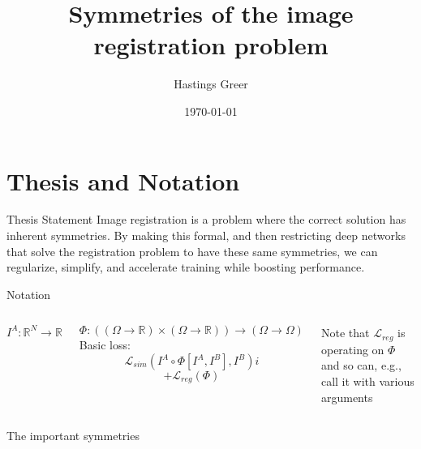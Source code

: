 \documentclass{beamer}
\title{Symmetries of the image registration problem}
\author{Hastings Greer}
\date{\today}
\begin{document}
\begin{frame}
    \titlepage
\end{frame}

\section{Thesis and Notation}

\begin{frame}{Thesis Statement}
Image registration is a problem where the correct solution has inherent symmetries. By making this formal, and then restricting deep networks that solve the registration problem to have these same symmetries, we can regularize, simplify, and accelerate training while boosting performance.
\end{frame}

\begin{frame}{Notation}
    \begin{columns}
	    $$I^A: \mathbb{R}^N \rightarrow \mathbb{R} $$

$$\Phi:
	\left( (\Omega \rightarrow \mathbb{R}) \times (\Omega \rightarrow \mathbb{R})
	\right) \rightarrow (\Omega \rightarrow \Omega) $$
	Basic loss:
	    $$ \mathcal{L}_{sim}(I^A \circ \Phi[I^A, I^B], I^B) i$$
	    $$+ \mathcal{L}_{reg}(\Phi)$$

	    Note that $\mathcal{L}_{reg}$ is operating on $\Phi$ and so can, e.g., call it with various arguments
    \end{columns}
\end{frame}

\begin{frame}{The important symmetries}
\end{frame}
\end{document}
